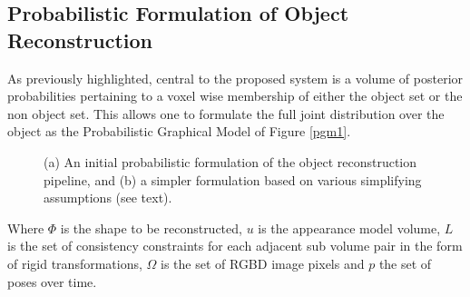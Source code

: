 \subsection{Probabilistic Formulation of Object Reconstruction}
As previously highlighted, central to the proposed system is a volume of posterior probabilities pertaining to a voxel wise membership of either the 
object set or the non object set. This allows one to formulate the full joint distribution over the object as the Probabilistic 
Graphical Model of Figure \ref{pgm1}.
\begin{figure}[!t]
	\centering
	\hspace{12mm}%
	\caption{(a) An initial probabilistic formulation of the object reconstruction pipeline, and (b) a simpler formulation based on various simplifying assumptions (see text).}
\end{figure}

Where $\Phi$ is the shape to be reconstructed, $u$ is the appearance model volume, $L$ is the 
set of consistency constraints for each adjacent sub volume pair in the form of rigid transformations, $\Omega$ is the set of 
RGBD image pixels and $p$ the set of poses over time.

